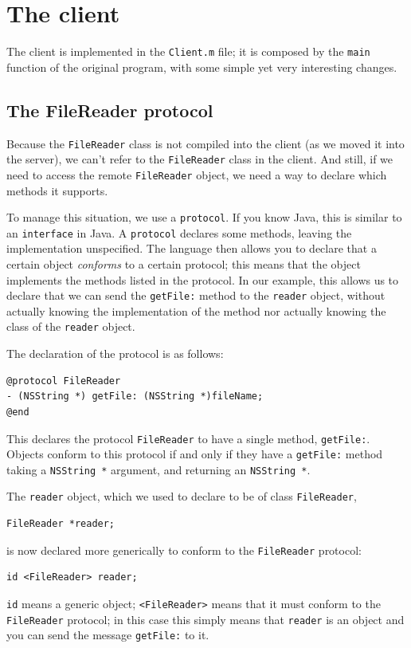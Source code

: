\documentclass[a4paper]{article}
\begin{document}
\section{The client}
The client is implemented in the \texttt{Client.m} file; it is
composed by the \texttt{main} function of the original program, with
some simple yet very interesting changes.

\subsection{The FileReader protocol}
Because the \texttt{FileReader} class is not compiled into the client
(as we moved it into the server), we can't refer to the
\texttt{FileReader} class in the client.  And still, if we need to
access the remote \texttt{FileReader} object, we need a way to declare
which methods it supports.

To manage this situation, we use a \texttt{protocol}.  If you know
Java, this is similar to an \texttt{interface} in Java.  A
\texttt{protocol} declares some methods, leaving the implementation
unspecified.  The language then allows you to declare that a certain
object {\it conforms} to a certain protocol; this means that the
object implements the methods listed in the protocol.  In our example,
this allows us to declare that we can send the \texttt{getFile:}
method to the \texttt{reader} object, without actually knowing the
implementation of the method nor actually knowing the class of the
\texttt{reader} object.

The declaration of the protocol is as follows:
\begin{verbatim}
@protocol FileReader
- (NSString *) getFile: (NSString *)fileName;
@end
\end{verbatim}
This declares the protocol \texttt{FileReader} to have a single
method, \texttt{getFile:}.  Objects conform to this protocol if and
only if they have a \texttt{getFile:} method taking a \texttt{NSString
  *} argument, and returning an \texttt{NSString *}.

The \texttt{reader} object, which we used to declare to be of class
\texttt{FileReader},
\begin{verbatim}
FileReader *reader;
\end{verbatim}
is now declared more generically to conform to the \texttt{FileReader}
protocol:
\begin{verbatim}
id <FileReader> reader;
\end{verbatim}
\texttt{id} means a generic object; \texttt{<FileReader>} means that
it must conform to the \texttt{FileReader} protocol; in this case this
simply means that \texttt{reader} is an object and you can send the
message \texttt{getFile:} to it.
\end{document}
